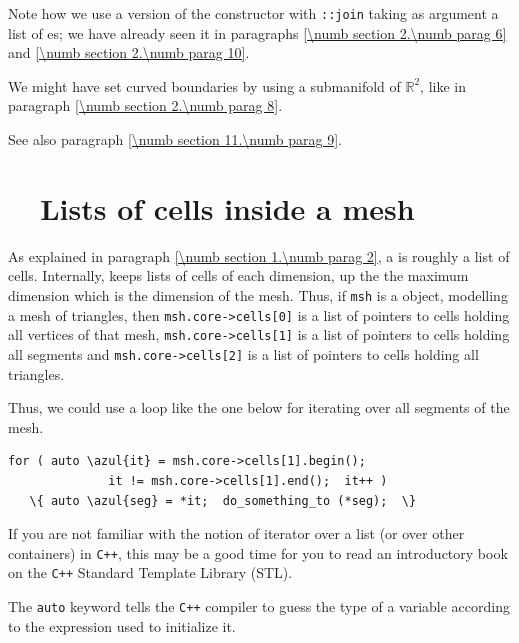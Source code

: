 Note how we use a version of the {\small\tt {}} constructor with {\small\tt {}::join}
taking as argument a list of {\small\tt {}}es; we have already seen it in paragraphs
\ref{\numb section 2.\numb parag 6} and \ref{\numb section 2.\numb parag 10}.

We might have set curved boundaries by using a submanifold of $ \mathbb{R}^2 $, like in paragraph
\ref{\numb section 2.\numb parag 8}.

See also paragraph \ref{\numb section 11.\numb parag 9}.


\section{~~Lists of cells inside a mesh}\label{\numb section 9.\numb parag 3}

As explained in paragraph \ref{\numb section 1.\numb parag 2}, a {\small\tt {}} is
roughly a list of cells.
Internally, {\maniFEM} keeps lists of cells of each dimension, up the the maximum
dimension which is the dimension of the mesh.
Thus, if {\small\tt msh} is a {\small\tt {}} object, modelling a
mesh of triangles, then {\small\tt msh.core->cells[0]} is a list of pointers to cells holding
all vertices of that mesh, {\small\tt msh.core->cells[1]} is a list of pointers to cells
holding all segments and {\small\tt msh.core->cells[2]} is a list of pointers to cells
holding all triangles.

Thus, we could use a loop like the one below for iterating over all segments of the mesh.

\begin{Verbatim}[commandchars=\\\{\},formatcom=\small\tt,
   baselinestretch=0.94,framesep=2mm                      ]
   for ( auto \azul{it} = msh.core->cells[1].begin();
              it != msh.core->cells[1].end();  it++ )
   \{ auto \azul{seg} = *it;  do_something_to (*seg);  \}
\end{Verbatim}

If you are not familiar with the notion of iterator over a list (or over other containers)
in {\tt C++}, this may be a good time for you to read an introductory book on the
{\tt C++} Standard Template Library (STL).

The {\small\tt auto} keyword tells the {\tt C++} compiler to guess the type of a variable
according to the expression used to initialize it.

